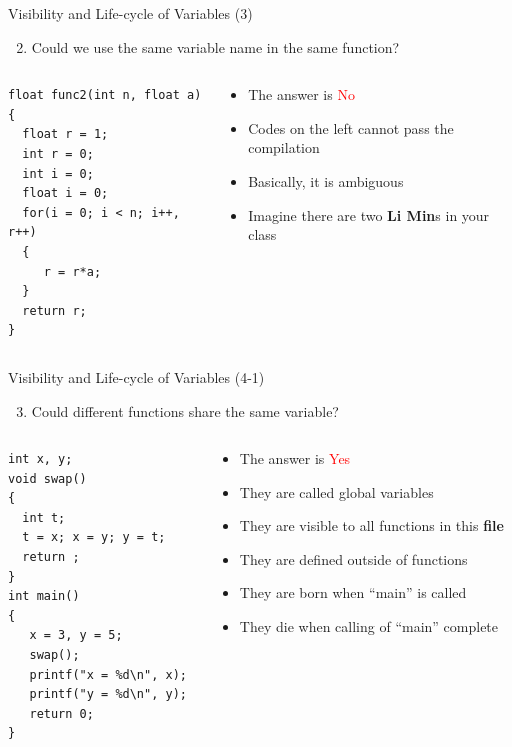 \begin{frame}[fragile]{Visibility and Life-cycle of Variables (3)}
\begin{enumerate}
	\setcounter{enumi}{1}
	\item {Could we use the same variable name in the same function?}
\end{enumerate}
\begin{columns}
\begin{column}{0.55\linewidth}
\begin{lstlisting}[linewidth=0.9\linewidth, xleftmargin=0.05\linewidth]
float func2(int n, float a)
{
  float r = 1;
  int r = 0;
  int i = 0;
  float i = 0;
  for(i = 0; i < n; i++, r++)
  {
     r = r*a;
  }
  return r;
}
\end{lstlisting}
\end{column}
\begin{column}{0.44\linewidth}
\begin{itemize}
	\item {The answer is \textcolor{red}{No}}
	\item {Codes on the left cannot pass the compilation}
	\item {Basically, it is ambiguous}
	\item {Imagine there are two \textbf{Li Min}s in your class}
\end{itemize}
\end{column}
\end{columns}
\end{frame}

\begin{frame}[fragile]{Visibility and Life-cycle of Variables (4-1)}
\begin{enumerate}
	\setcounter{enumi}{2}
	\item{Could different functions share the same variable?}
\end{enumerate}
\begin{columns}
\begin{column}{0.52\linewidth}
\begin{lstlisting}[xleftmargin=0.05\linewidth, linewidth=0.85\linewidth]
int x, y;
void swap()
{
  int t;
  t = x; x = y; y = t;
  return ;
}
int main()
{
   x = 3, y = 5;
   swap();
   printf("x = %d\n", x);
   printf("y = %d\n", y);
   return 0;
}
\end{lstlisting}
\end{column}
\begin{column}{0.47\linewidth}
\begin{itemize}
	\item {The answer is \textcolor{red}{Yes}}
	\item {They are called global variables}
	\item {They are visible to all functions in this \textbf{file}}
	\item {They are defined outside of functions}
	\item {They are born when ``main'' is called}
	\item {They die when calling of ``main'' complete}
\end{itemize}
\end{column}
\end{columns}
\end{frame}

